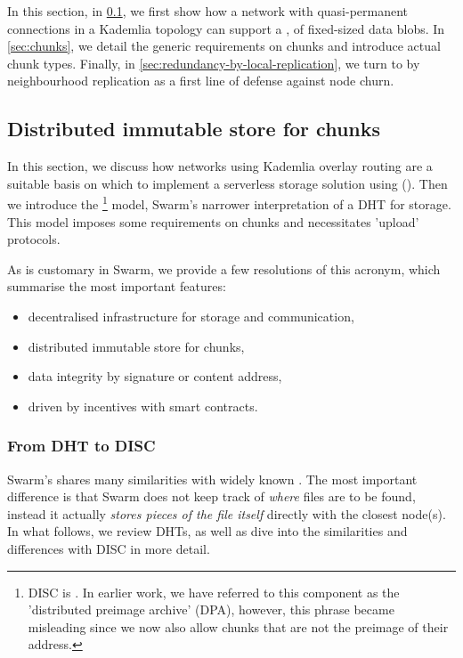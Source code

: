 In this section, in \ref{sec:disc}, we first show how a network with quasi-permanent connections in a Kademlia topology can support a ,  of fixed-sized data blobs. In \ref{sec:chunks}, we detail the generic requirements on chunks and introduce actual chunk types. Finally, in \ref{sec:redundancy-by-local-replication}, we turn to  by neighbourhood replication as a first line of defense against node churn.

\subsection{Distributed immutable store for chunks\statusgreen}\label{sec:disc}
 
In this section, we discuss how networks using Kademlia overlay routing are a suitable basis on which to implement a serverless storage solution using  (). Then we introduce the %
%
\footnote{DISC is . In earlier work, we have referred to this component as the 'distributed preimage archive' (DPA), however, this phrase became misleading since we now also allow chunks that are not the preimage of their address.}
% 
model, Swarm's narrower interpretation of a DHT for storage. This model 
imposes some requirements on chunks and necessitates 'upload' protocols. 

As is customary in Swarm, we provide a few resolutions of this acronym, which summarise the most important features:


\begin{itemize}
\item {decentralised infrastructure for storage and communication}, 
\item {distributed immutable store for chunks}, 
\item {data integrity by signature or content address},
\item {driven by incentives with smart contracts}. 
\end{itemize}
 
\subsubsection{From DHT to DISC}
Swarm's  shares many similarities with widely known . The most important difference is that Swarm does not keep track of \emph{where} files are to be found, instead it actually \emph{stores pieces of the file itself} directly with the closest node(s). 
In what follows, we review DHTs, as well as dive into the similarities and differences with DISC in more detail. 
 
